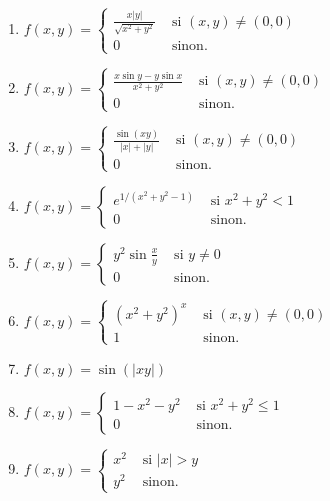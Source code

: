 \begin{exercice}
\begin{enumerate}
 \item\boringexo
 $    f(x,y) = \left\{
         \begin{array}{cc}
         \displaystyle\frac{x|y|}{\sqrt{x^2+y^2}}& \mbox{ si }(x,y) \neq (0,0) \\
         0 & \mbox{ sinon. }
         \end{array}
         \right .$
 \item\minsyndical
 $ f(x,y) = \left\{
         \begin{array}{cc}
         \displaystyle\frac{x\sin y - y \sin x}{x^2+y^2}& \mbox{ si }(x,y) \neq (0,0) \\
         0 & \mbox{ sinon. }
         \end{array}
         \right .$
 \item\boringexo
  $   f(x,y) = \left\{
         \begin{array}{cc}
         \displaystyle\frac{\sin (xy)}{|x| + |y|}& \mbox{ si }(x,y) \neq (0,0) \\
         0 & \mbox{ sinon. }
         \end{array}
         \right .$
 \item\boringexo
  $  f(x,y) = \left\{
         \begin{array}{cc}
         e ^{1/(x^2 + y^2 - 1)}& \mbox{ si }x^2 + y^2  <1 \\
         0 & \mbox{ sinon. }
         \end{array}
         \right .$
 \item\minsyndical
   $ f(x,y) = \left\{
         \begin{array}{cc}
         y^2\sin \displaystyle\frac{x}{y}& \mbox{ si }y \neq 0 \\
         0 & \mbox{ sinon. }
         \end{array}
         \right .$
 \item\minsyndical
 $   f(x,y) = \left\{
         \begin{array}{cc}
         (x^2 + y^2)^x & \mbox{ si }(x,y) \neq (0,0) \\
         1 & \mbox{ sinon. }
         \end{array}
         \right .$
 \item\boringexo
   $      f(x,y) = \sin (|xy|) $
\item\boringexo
 $   f(x,y) = \left\{
         \begin{array}{cc}
         1 - x^2 - y^2& \mbox{ si } x^2 + y^2 \leq 1 \\
         0 & \mbox{ sinon. }
         \end{array}
         \right .$
 \item\minsyndical
  $  f(x,y) = \left\{
         \begin{array}{cc}
         x^2& \mbox{ si } |x| >y \\
         y^2 & \mbox{ sinon. }
         \end{array}
         \right .$
\end{enumerate}

\end{exercice}
